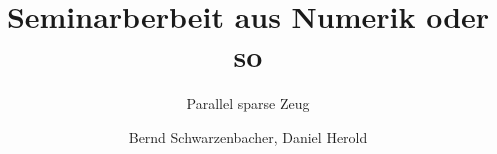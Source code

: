 \documentclass[a4paper,11pt]{article}
\title{Seminarberbeit aus Numerik oder so}
\subtitle{Parallel sparse Zeug}
\author{Bernd Schwarzenbacher, Daniel Herold}
\begin{document}
\maketitle
\tableofcontents

\pagebreak
\end{document}
